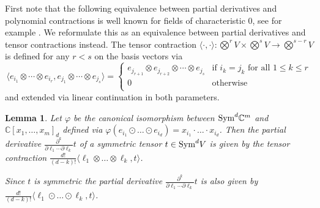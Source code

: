 \documentclass[10pt,a4paper]{article}
\numberwithin{equation}{section}
\newtheorem{lemma}[equation]{Lemma}
\theoremstyle{definition}
\newcommand{\Sym}{\textup{Sym}}
\newcommand{\IC}{\mathbb{C}}
\begin{document}
First note that the following equivalence between partial derivatives and polynomial contractions is well known for fields of characteristic $0$, see for example \cite[Equation 1.1.2]{iarrobino1999power}.
We reformulate this as an equivalence between partial derivatives and tensor contractions instead. The tensor contraction $\langle \cdot, \cdot \rangle : \bigotimes^r V  \times \bigotimes^s V \to \bigotimes^{s-r} V$ is defined for any $r < s$ on the basis vectors via 
\[
    \langle e_{i_1} \otimes \cdots \otimes  e_{i_{r}}, e_{j_1} \otimes \cdots \otimes e_{j_{s}}\rangle = \begin{cases}
    e_{j_{r+1}} \otimes e_{j_{r+2}} \otimes \cdots \otimes e_{j_s} & \text{if $i_k = j_k$ for all $1 \leq k \leq r$}\\
    0 & \text{otherwise}\\
    \end{cases}
\]
and extended via linear continuation in both parameters.
\begin{lemma}
    \label{lem:derivativecontr}
    Let $\varphi$ be the canonical isomorphism between $\Sym^d \IC^m$ and $\IC[x_1,\ldots,x_m]_d$ defined via $\varphi\left(e_{i_1} \odot \dots \odot e_{i_d}\right) = x_{i_1} \cdot \dots \cdot x_{i_d}$.
    Then the partial derivative $\frac{\partial^k}{\partial\ell_1 \cdots \partial\ell_k}t$ of a symmetric tensor $t \in \Sym^d V$ is given by the tensor contraction $\frac{d!}{(d-k)!}\langle \ell_1 \otimes \dots \otimes \ell_k, t \rangle$.

    Since $t$ is symmetric the partial derivative $\frac{\partial^k}{\partial\ell_1 \cdots \partial\ell_k}t$ is also given by $\frac{d!}{(d-k)!} \langle \ell_1 \odot \dots \odot \ell_k, t \rangle$.
\end{lemma}
\end{document}
